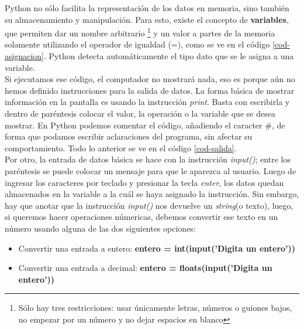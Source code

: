 Python no sólo facilita la representación de los datos en memoria, sino también su almacenamiento y manipulación. Para esto, existe el concepto de \textbf{variables}, que permiten dar un nombre arbitrario \footnote{Sólo hay tres restricciones: usar únicamente letras, números o guiones bajos, no empezar por un número y no dejar espacios en blanco} y un valor a partes de la memoria solamente utilizando el operador de igualdad (=), como se ve en el código \ref{cod-asignacion}. Python detecta automáticamente el tipo dato que se le asigna a una variable. \\



Si ejecutamos ese código, el computador no mostrará nada, eso es porque aún no hemos definido instrucciones para la salida de datos. La forma básica de mostrar información en la pantalla es usando la instrucción \emph{print}. Basta con escribirla y dentro de paréntesis colocar el valor, la operación o la variable que se desea mostrar. En Python podemos comentar el código, añadiendo el caracter \#, de forma que podamos escribir aclaraciones del programa, sin afectar su comportamiento. Todo lo anterior se ve en el código \ref{cod-salida}. \\




Por otro, la entrada de datos básica se hace con la instrucción \emph{input()}; entre los paréntesis se puede colocar un mensaje para que le aparezca al usuario. Luego de ingresar los caracteres por teclado y presionar la tecla \emph{enter}, los datos quedan almacenados en la variable a la cuál se haya asignado la instrucción. Sin embargo, hay que anotar que la instrucción \emph{input()} nos devuelve un \emph{string}(o texto), luego, si queremos hacer operaciones númericas, debemos convertir ese texto en un número usando alguna de las dos siguientes opciones:

\begin{itemize}
 \item Convertir una entrada a entero: \textbf{entero = int(input('Digita un entero'))}
 \item Convertir una entrada a decimal: \textbf{entero = floats(input('Digita un entero'))}
\end{itemize}

